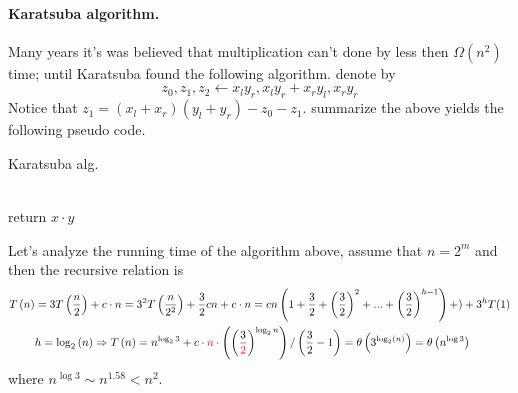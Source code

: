 \paragraph{Karatsuba algorithm.} Many years it's was believed that multiplication can't done by less then \( \Omega \left( n^2 \right) \) time; until Karatsuba found the following algorithm. denote by \begin{equation*}
z_0, z_1, z_2 \leftarrow x_{l}y_{r}, x_{l}y_{r} + x_{r}y_{l}, x_{r}y_{r}
\end{equation*}Notice that \( z_1 = \left(x_{l}+x_{r}\right)\left(y_{l}+y_{r}\right) - z_{0} -z_{1} \). summarize the above yields the following pseudo code. 

\begin{algbox}{Karatsuba alg.}
\begin{algorithm}[H]
\SetAlgoLined
{}
 \ \\ 
    { return \(x \cdot y\) } 
 \ \\ 
 
\end{algorithm}
\end{algbox}
Let's analyze the running time of the algorithm above, assume that \(n = 2^{m}\) and then the recursive relation is 
\begin{equation*}
    \begin{split}
        T\left(n\right) & = 3T\left(\frac{n}{2}\right) + c\cdot n = 3^2 T\left(\frac{n}{2^2}\right) + \frac{3}{2}cn + c\cdot n = cn\left(1 + \frac{3}{2} + \left(\frac{3}{2}\right)^2 + ...  + \left(\frac{3}{2}\right)^{h-1} \right) + ) + 3^{h}T(1) \\
        & h = \log_{2}\left(n\right) \Rightarrow T\left(n\right) = n^{\log_{2}{3}} +  c\cdot \textcolor{red}{n}\cdot \left(\left(\frac{3}{\textcolor{red}{2}}\right)^{\log_{2}{n}}\right) / \left(\frac{3}{2} - 1\right) = \theta \left( 3^{\log_{2}(n)} \right) =  \theta \left( n^{\log 3} \right)  
    \end{split}
\end{equation*}
where \(n^{\log 3}  \sim n^{1.58} < n^2 \).



